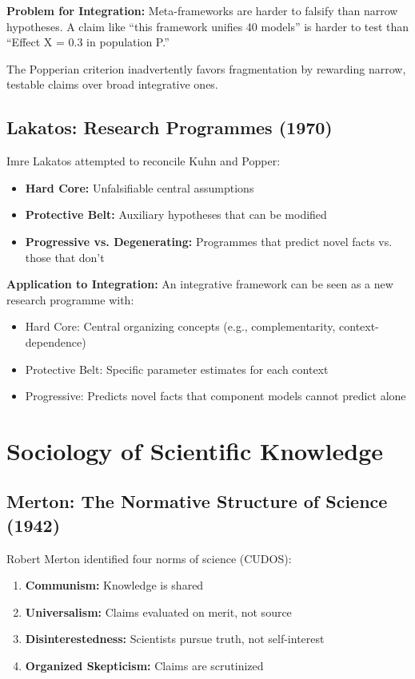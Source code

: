 \documentclass[12pt,a4paper]{article}
\begin{document}
\textbf{Problem for Integration:}
Meta-frameworks are harder to falsify than narrow hypotheses. A claim like ``this framework unifies 40 models'' is harder to test than ``Effect X = 0.3 in population P.''

The Popperian criterion inadvertently favors fragmentation by rewarding narrow, testable claims over broad integrative ones.

\subsection{Lakatos: Research Programmes (1970)}

Imre Lakatos attempted to reconcile Kuhn and Popper:
\begin{itemize}
\item \textbf{Hard Core:} Unfalsifiable central assumptions
\item \textbf{Protective Belt:} Auxiliary hypotheses that can be modified
\item \textbf{Progressive vs. Degenerating:} Programmes that predict novel facts vs. those that don't
\end{itemize}

\textbf{Application to Integration:}
An integrative framework can be seen as a new research programme with:
\begin{itemize}
\item Hard Core: Central organizing concepts (e.g., complementarity, context-dependence)
\item Protective Belt: Specific parameter estimates for each context
\item Progressive: Predicts novel facts that component models cannot predict alone
\end{itemize}

\section{Sociology of Scientific Knowledge}
\label{sec:ssk}

\subsection{Merton: The Normative Structure of Science (1942)}

Robert Merton identified four norms of science (CUDOS):
\begin{enumerate}
\item \textbf{Communism:} Knowledge is shared
\item \textbf{Universalism:} Claims evaluated on merit, not source
\item \textbf{Disinterestedness:} Scientists pursue truth, not self-interest
\item \textbf{Organized Skepticism:} Claims are scrutinized
\end{enumerate}
\end{document}
